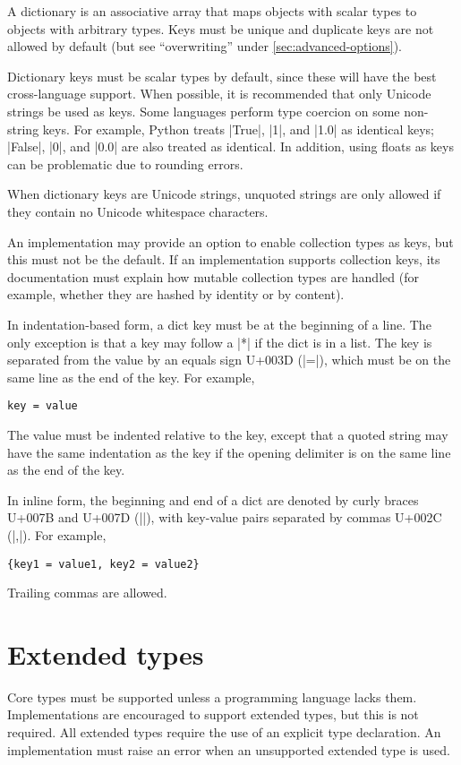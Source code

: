 \documentclass[11pt]{article}
\begin{document}
A dictionary is an associative array that maps objects with scalar types to objects with arbitrary types.  Keys must be unique and duplicate keys are not allowed by default (but see ``overwriting'' under \cref{sec:advanced-options}).

Dictionary keys must be scalar types by default, since these will have the best cross-language support.  When possible, it is recommended that only Unicode strings be used as keys.  Some languages perform type coercion on some non-string keys.  For example, Python treats |True|, |1|, and |1.0| as identical keys; |False|, |0|, and |0.0| are also treated as identical.  In addition, using floats as keys can be problematic due to rounding errors.

When dictionary keys are Unicode strings, unquoted strings are only allowed if they contain no Unicode whitespace characters.

An implementation may provide an option to enable collection types as keys, but this must not be the default.  If an implementation supports collection keys, its documentation must explain how mutable collection types are handled (for example, whether they are hashed by identity or by content).

In indentation-based form, a dict key must be at the beginning of a line.  The only exception is that a key may follow a |*| if the dict is in a list.  The key is separated from the value by an equals sign U+003D (|=|), which must be on the same line as the end of the key.  For example,
\begin{Verbatim}
key = value
\end{Verbatim}
The value must be indented relative to the key, except that a quoted string may have the same indentation as the key if the opening delimiter is on the same line as the end of the key.

In inline form, the beginning and end of a dict are denoted by curly braces U+007B and U+007D (|{}|), with key-value pairs separated by commas U+002C (|,|).  For example,
\begin{Verbatim}
{key1 = value1, key2 = value2}
\end{Verbatim}
Trailing commas are allowed.



\section{Extended types}

Core types must be supported unless a programming language lacks them.  Implementations are encouraged to support extended types, but this is not required.  All extended types require the use of an explicit type declaration.  An implementation must raise an error when an unsupported extended type is used.
\end{document}
